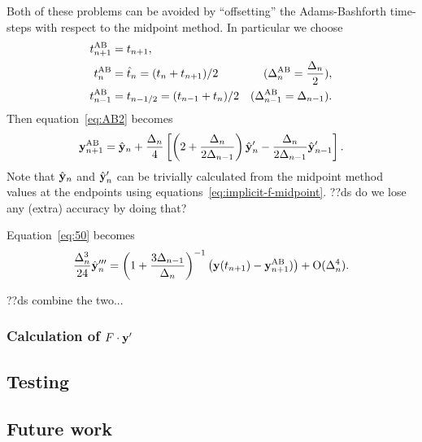 Both of these problems can be avoided by ``offsetting'' the Adams-Bashforth time-steps with respect to the midpoint method.
In particular we choose
\begin{align}
  t_{n+1}^{\text{AB}} &= t_{n+1}, \notag\\
  t_n^{\text{AB}} &= \hat{t}_n = (t_{n} + t_{n+1})/2 &(\Delta_{n}^{\text{AB}} = \frac{\Delta_{n}}{2}), \notag \\
  t_{n-1}^{\text{AB}} &= t_{n - 1/2} = (t_{n-1} + t_n)/2  &(\Delta_{n-1}^{\text{AB}} = \Delta_{n-1}).
  \label{eq:ab2-ts}
\end{align}
Then equation~\eqref{eq:AB2} becomes
\begin{equation}
   \mathbf{y}_{n+1}^{\text{AB}} = \hat{\mathbf{y}}_n + \frac{\Delta_{n}}{4} \left[
     \left (2 + \frac{\Delta_{n}}{2\Delta_{n-1}} \right) \hat{\mathbf{y}}_n'
     - \frac{\Delta_{n}}{2\Delta_{n-1}} \hat{\mathbf{y}}_{n-1}'
     \right].
\end{equation}
Note that $\hat{\mathbf{y}}_n$ and $\hat{\mathbf{y}}_n'$ can be trivially calculated from the midpoint method values at the endpoints using equations~\eqref{eq:implicit-f-midpoint}.
??ds do we lose any (extra) accuracy by doing that?

Equation~\eqref{eq:50} becomes
\begin{equation}
   \frac{\Delta_{n}^3}{24} \hat{\mathbf{y}}_n''' = \left(1 + \frac{3 \Delta_{n-1}}{\Delta_{n}} \right)^{-1}
  \left( \mathbf{y}(t_{n+1}) - \mathbf{y}_{n+1}^{\text{AB}}) \right) + \text{O}(\Delta_{n}^4).
\end{equation}

??ds combine the two...

\subsubsection{Calculation of $F \cdot \mathbf{y}'$}


\subsection{Testing}




\subsection{Future work}




